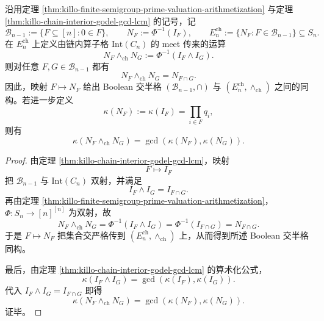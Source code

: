 \begin{theorem}\label{thm:killo-prime-register-chain-idempotent-boolean-meet}
沿用定理 \ref{thm:killo-finite-semigroup-prime-valuation-arithmetization} 与定理 \ref{thm:killo-chain-interior-godel-gcd-lcm} 的记号，记
\[
\mathcal B_{n-1}:=\{F\subseteq [n]:0\in F\},
\qquad
N_F:=\Phi^{-1}(I_F),
\qquad
E_n^{\mathrm{ch}}:=\{N_F:F\in\mathcal B_{n-1}\}\subseteq S_n.
\]
在 \(E_n^{\mathrm{ch}}\) 上定义由链内算子格 \(\mathrm{Int}(C_n)\) 的 meet 传来的运算
\[
N_F\wedge_{\mathrm{ch}}N_G
:=
\Phi^{-1}(I_F\wedge I_G).
\]
则对任意 \(F,G\in\mathcal B_{n-1}\) 都有
\[
N_F\wedge_{\mathrm{ch}}N_G=N_{F\cap G}.
\]
因此，映射 \(F\mapsto N_F\) 给出 Boolean 交半格 \((\mathcal B_{n-1},\cap)\) 与 \((E_n^{\mathrm{ch}},\wedge_{\mathrm{ch}})\) 之间的同构。若进一步定义
\[
\kappa(N_F):=\kappa(I_F)=\prod_{i\in F}q_i,
\]
则有
\[
\kappa(N_F\wedge_{\mathrm{ch}}N_G)=\gcd(\kappa(N_F),\kappa(N_G)).
\]
\end{theorem}
\begin{proof}
由定理 \ref{thm:killo-chain-interior-godel-gcd-lcm}，映射
\[
F\longmapsto I_F
\]
把 \(\mathcal B_{n-1}\) 与 \(\mathrm{Int}(C_n)\) 双射，并满足
\[
I_F\wedge I_G=I_{F\cap G}.
\]
再由定理 \ref{thm:killo-finite-semigroup-prime-valuation-arithmetization}，\(\Phi:S_n\to[n]^{[n]}\) 为双射，故
\[
N_F\wedge_{\mathrm{ch}}N_G
=
\Phi^{-1}(I_F\wedge I_G)
=
\Phi^{-1}(I_{F\cap G})
=
N_{F\cap G}.
\]
于是 \(F\mapsto N_F\) 把集合交严格传到 \((E_n^{\mathrm{ch}},\wedge_{\mathrm{ch}})\) 上，从而得到所述 Boolean 交半格同构。

最后，由定理 \ref{thm:killo-chain-interior-godel-gcd-lcm} 的算术化公式，
\[
\kappa(I_F\wedge I_G)=\gcd(\kappa(I_F),\kappa(I_G)).
\]
代入 \(I_F\wedge I_G=I_{F\cap G}\) 即得
\[
\kappa(N_F\wedge_{\mathrm{ch}}N_G)=\gcd(\kappa(N_F),\kappa(N_G)).
\]
证毕。
\end{proof}

